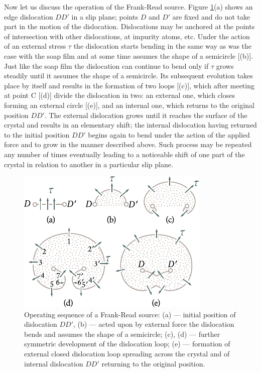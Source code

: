 Now let us discuss the operation of the Frank-Read source. Figure \ref{fig:2_22}(a) shows an edge dislocation $DD'$ in a slip plane; points $D$ and $D'$ are fixed and do not take part in the motion of the dislocation. Dislocations may be anchored at the points of intersection with other dislocations, at impurity atoms, etc. Under the action of an external stress $\tau$ the dislocation starts bending in the same way as was the case with the soap film and at some time assumes the shape of a semicircle [(b)]. Just like the soap film the dislocation can continue to bend only if $\tau$ grows steadily until it assumes the shape of a semicircle. Its subsequent evolution takes place by itself and results in the formation of two loops [(c)], which after meeting at point C [(d)] divide the dislocation in two: an external one, which closes forming an external circle [(e)], and an internal one, which returns to the original position $DD'$. The external dislocation grows until it reaches the surface of the crystal and results in an elementary shift; the internal dislocation having returned to the initial position $DD'$ begins again to bend under the action of the applied force and to grow in the manner described above. Such process may be repeated any number of times eventually leading to a noticeable shift of one part of the crystal in relation to another in a particular slip plane.

\begin{figure}[t]
	\begin{center}
		\includegraphics[scale=1.1]{figures/ch_02/fig_2_22.pdf}
		\caption[]{Operating sequence of a Frank-Read source: (a) --- initial position of dislocation $DD'$, (b) --- acted upon by external force the dislocation bends and assumes the shape of a semicircle; (c), (d) --- further symmetric development of the dislocation loop; (e) --- formation of external closed dislocation loop spreading across the crystal and of internal dislocation $DD'$ returning to the original position.}
		\label{fig:2_22}
	\end{center}
	\vspace{-0.7cm}
\end{figure}

